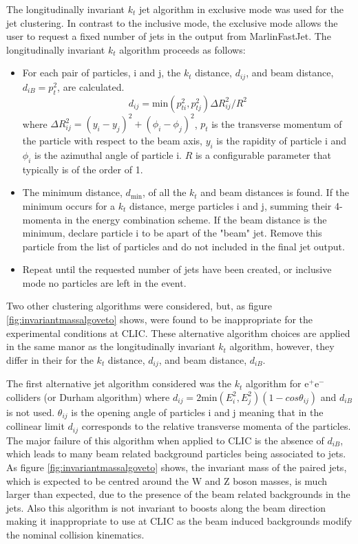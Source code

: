 The longitudinally invariant $k_{t}$ jet algorithm in exclusive mode was used for the jet clustering.  In contrast to the inclusive mode, the exclusive mode allows the user to request a fixed number of jets in the output from MarlinFastJet.  The longitudinally invariant $k_{t}$ algorithm proceeds as follows:
\begin{itemize}
\item For each pair of particles, i and j, the $k_{t}$ distance, $d_{ij}$, and beam distance, $d_{iB} = p_{t}^{2}$, are calculated.
\begin{equation}
d_{ij} = \text{min}(p_{ti}^{2}, p_{tj}^{2}){\Delta}R^{2}_{ij}/R^{2}
\end{equation}
where ${\Delta}R^{2}_{ij} = (y_{i} - y_{j})^2 + (\phi_{i} - \phi_{j})^2$, $p_{t}$ is the transverse momentum of the particle with respect to the beam axis, $y_{i}$ is the rapidity of particle i and $\phi_{i}$ is the azimuthal angle of particle i. $R$ is a configurable parameter that typically is of the order of 1.
\item The minimum distance, $d_\text{min}$, of all the $k_{t}$ and beam distances is found.  If the minimum occurs for a $k_{t}$ distance, merge particles i and j, summing their 4-momenta in the energy combination scheme.  If the beam distance is the minimum, declare particle i to be apart of the "beam" jet.  Remove this particle from the list of particles and do not included in the final jet output.
\item Repeat until the requested number of jets have been created, or inclusive mode no particles are left in the event.
\end{itemize}

Two other clustering algorithms were considered, but, as figure \ref{fig:invariantmassalgoveto} shows, were found to be inappropriate for the experimental conditions at CLIC.  These alternative algorithm choices are applied in the same manor as the longitudinally invariant $k_{t}$ algorithm, however, they differ in their for the $k_{t}$ distance, $d_{ij}$, and beam distance, $d_{iB}$.

The first alternative jet algorithm considered was the $k_{t}$ algorithm for $\text{e}^{+}\text{e}^{-}$ colliders (or Durham algorithm) where $d_{ij} = 2\text{min}(E_{i}^{2}, E_{j}^{2})(1-cos\theta_{ij})$ and $d_{iB}$ is not used.  $\theta_{ij}$ is the opening angle of particles i and j meaning that in the collinear limit $d_{ij}$ corresponds to the relative transverse momenta of the particles.  The major failure of this algorithm when applied to CLIC is the absence of $d_{iB}$, which leads to many beam related background particles being associated to jets.  As figure \ref{fig:invariantmassalgoveto} shows, the invariant mass of the paired jets, which is expected to be centred around the W and Z boson masses, is much larger than expected, due to the presence of the beam related backgrounds in the jets.  Also this algorithm is not invariant to boosts along the beam direction making it inappropriate to use at CLIC as the beam induced backgrounds modify the nominal collision kinematics.  

